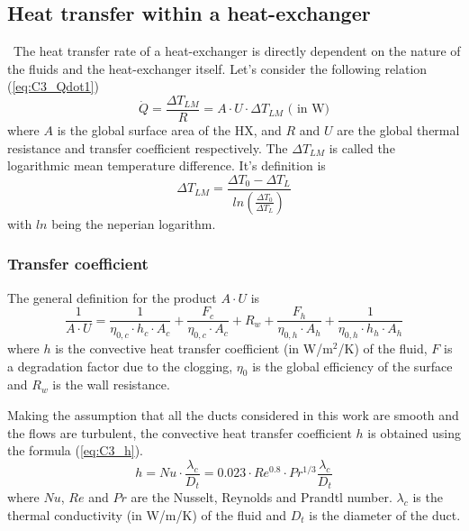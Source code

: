 \subsection{Heat transfer within a heat-exchanger}
\quad\, The heat transfer rate of a heat-exchanger is directly dependent on the nature of the fluids and the heat-exchanger itself. Let's consider the following relation (\ref{eq:C3_Qdot1})
\begin{equation}
\dot{Q} = \frac{\Delta T_{LM}}{R}= A\cdot U\cdot \Delta T_{LM}\text{ ( in W)}\label{eq:C3_Qdot1}
\end{equation}
where $A$ is the global surface area of the HX, and $R$ and $U$ are the global thermal resistance and transfer coefficient respectively. The $\Delta T_{LM}$ is called the logarithmic mean temperature difference. It's definition is
\begin{equation}
\Delta T_{LM} = \frac{\Delta T_0-\Delta T_L}{ln\left(\frac{\Delta T_0}{\Delta T_L}\right)}\label{eq:C3_lmtd}
\end{equation} 
with $ln$ being the neperian logarithm.
\subsubsection{Transfer coefficient}
The general definition for the product $A\cdot U$ is 
\begin{equation}
\frac{1}{A\cdot U}  = \frac{1}{\eta_{0,c}\cdot h_c \cdot A_c} + \frac{F_c}{\eta_{0,c}\cdot A_c} + R_w + \frac{F_h}{\eta_{0,h}\cdot A_h} + \frac{1}{\eta_{0,h}\cdot h_h \cdot A_h}\label{eq:C3_AU}
\end{equation}
where $h$ is the convective heat transfer coefficient (in W/m$^2$/K) of the fluid, $F$ is a degradation factor due to the clogging, $\eta_0$ is the global efficiency of the surface and $R_w$ is the wall resistance. 

Making the assumption that all the ducts considered in this work are smooth and the flows are turbulent, the convective heat transfer coefficient $h$ is obtained using the formula (\ref{eq:C3_h}).
\begin{equation}
h = Nu \cdot \frac{\lambda_c}{D_t} = 0.023\cdot Re^{0.8}\cdot Pr^{1/3}\frac{\lambda_c}{D_t}
\end{equation}
where $Nu$, $Re$ and $Pr$ are the Nusselt, Reynolds and Prandtl number. $\lambda_c$ is the thermal conductivity (in W/m/K) of the fluid and $D_t$ is the diameter of the duct\citep{Ngendakumana2018}.

